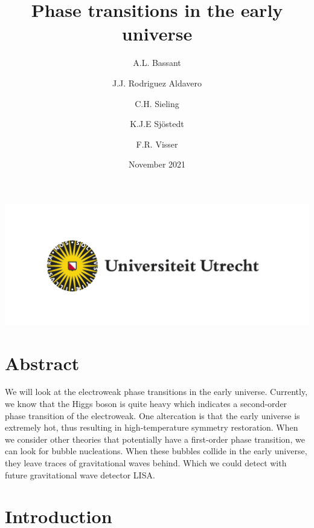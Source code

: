 \documentclass{article}
\title{Phase transitions in the early universe}
\author{
  A.L. Bassant\\
  \and
  J.J. Rodriguez Aldavero\\
  \and
  C.H. Sieling\\
  \and
  K.J.E Sjöstedt\\
  \and
  F.R. Visser\\
}
\date{November 2021}
\numberwithin{equation}{section}
\begin{document}
\maketitle

\begin{center}
    \includegraphics[]{UU_logo_NL_RGB.jpg}
    \section*{Abstract}  
\end{center}

We will look at the electroweak phase transitions in the early universe.
Currently, we know that the Higgs boson is quite heavy which indicates a second-order phase transition of the electroweak.
One altercation is that the early universe is extremely hot, thus resulting in high-temperature symmetry restoration.
When we consider other theories that potentially have a first-order phase transition, we can look for bubble nucleations.
When these bubbles collide in the early universe, they leave traces of gravitational waves behind.
Which we could detect with future gravitational wave detector LISA.


\newpage


\tableofcontents


\section{Introduction}
\end{document}
